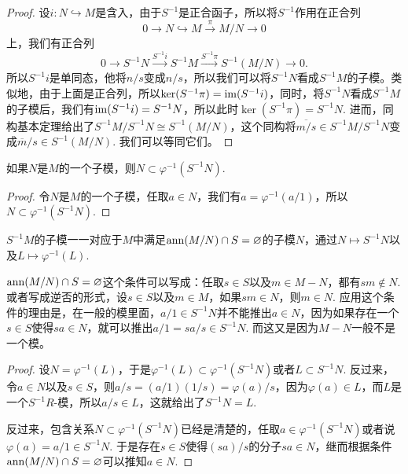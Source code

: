 \begin{proof}
	设$i:N\hookrightarrow M$是含入，由于$S^{-1}$是正合函子，所以将$S^{-1}$作用在正合列
	\[
		0\to N\hookrightarrow M\xrightarrow{\pi} M/N\to 0
	\]
	上，我们有正合列
	\[
		0\to S^{-1}N\xrightarrow{S^{-1}i}S^{-1}M\xrightarrow{S^{-1}\pi} S^{-1}(M/N)\to 0.
	\]
	所以$S^{-1}i$是单同态，他将$n/s$变成$n/s$，所以我们可以将$S^{-1}N$看成$S^{-1}M$的子模。类似地，由于上面是正合列，所以$\ker (S^{-1}\pi)=\operatorname{im} (S^{-1}i)$，同时，将$S^{-1}N$看成$S^{-1}M$的子模后，我们有$\operatorname{im} (S^{-1}i)=S^{-1}N$，所以此时$\ker (S^{-1}\pi)=S^{-1}N$. 进而，同构基本定理给出了$S^{-1}M/S^{-1}N\cong S^{-1}(M/N)$，这个同构将$\overline{m/s}\in S^{-1}M/S^{-1}N$变成$\overline m/s\in S^{-1}(M/N)$. 我们可以等同它们。
\end{proof}


\begin{lem}
	如果$N$是$M$的一个子模，则$N\subset \varphi^{-1}(S^{-1}N)$. 
\end{lem}


\begin{proof}
	令$N$是$M$的一个子模，任取$a\in N$，我们有$a=\varphi^{-1}(a/1)$，所以$N\subset \varphi^{-1}(S^{-1}N)$. 
\end{proof}

\begin{pro}\label{pro:3.5.19}
$S^{-1}M$的子模一一对应于$M$中满足$\operatorname{ann}(M/N)\cap S=\varnothing$的子模$N$，通过$N\mapsto S^{-1}N$以及$L\mapsto \varphi^{-1}(L)$.
\end{pro}

$\operatorname{ann}(M/N)\cap S=\varnothing$这个条件可以写成：任取$s\in S$以及$m\in M-N$，都有$sm\not\in N$. 或者写成逆否的形式，设$s\in S$以及$m\in M$，如果$sm\in N$，则$m\in N$. 应用这个条件的理由是，在一般的模里面，$a/1\in S^{-1}N$并不能推出$a\in N$，因为如果存在一个$s\in S$使得$sa\in N$，就可以推出$a/1=sa/s\in S^{-1}N$. 而这又是因为$M-N$一般不是一个模。

\begin{proof}
	设$N=\varphi^{-1}(L)$，于是$\varphi^{-1}(L)\subset \varphi^{-1}(S^{-1}N)$或者$L\subset S^{-1}N$. 反过来，令$a\in N$以及$s\in S$，则$a/s=(a/1)(1/s)=\varphi(a)/s$，因为$\varphi(a)\in L$，而$L$是一个$S^{-1}R$-模，所以$a/s\in L$，这就给出了$S^{-1}N=L$.

	反过来，包含关系$N\subset \varphi^{-1}(S^{-1}N)$已经是清楚的，任取$a\in \varphi^{-1}(S^{-1}N)$或者说$\varphi(a)=a/1\in S^{-1}N$. 于是存在$s\in S$使得$(sa)/s$的分子$sa\in N$，继而根据条件$\operatorname{ann}(M/N)\cap S=\varnothing$可以推知$a\in N$. 
\end{proof}

